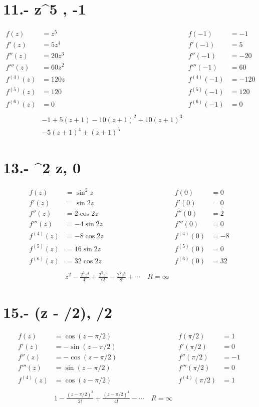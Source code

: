 \documentclass{article}
\begin{document}
\section*{11.- z^5 , -1}
\begin{align*}
f(z) &= z^5 & f(-1) &= -1 \\
f'(z) &= 5z^4 & f'(-1) &= 5 \\
f''(z) &= 20z^3 & f''(-1) &= -20 \\
f'''(z) &= 60z^2 & f'''(-1) &= 60 \\
f^{(4)}(z) &= 120z & f^{(4)}(-1) &= -120 \\
f^{(5)}(z) &= 120 & f^{(5)}(-1) &= 120 \\
f^{(6)}(z) &= 0 & f^{(6)}(-1) &= 0 \\
\\
& -1 + 5(z+1) - 10(z+1)^2 + 10(z+1)^3 \\
& - 5(z+1)^4 + (z+1)^5
\end{align*}
\section*{13.- \sin^2 z, 0  }
\begin{align*}
f(z) &= \sin^2 z & f(0) &= 0 \\
f'(z) &= \sin 2z & f'(0) &= 0 \\
f''(z) &= 2 \cos 2z & f''(0) &= 2 \\
f'''(z) &= -4 \sin 2z & f'''(0) &= 0 \\
f^{(4)}(z) &= -8 \cos 2z & f^{(4)}(0) &= -8 \\
f^{(5)}(z) &= 16 \sin 2z & f^{(5)}(0) &= 0 \\
f^{(6)}(z) &= 32 \cos 2z & f^{(6)}(0) &= 32 \\
\\
& z^2 - \frac{2^3 z^4}{4!} + \frac{2^5 z^6}{6!} - \frac{2^7 z^8}{8!} + \dotsb \quad R = \infty 
\end{align*}
\section*{15.- \cos (z - \pi/2), \pi/2   }
\begin{align*}
f(z) &= \cos (z - \pi/2) & f(\pi/2) &= 1 \\
f'(z) &= -\sin (z - \pi/2) & f'(\pi/2) &= 0 \\
f''(z) &= -\cos (z - \pi/2) & f''(\pi/2) &= -1 \\
f'''(z) &= \sin (z - \pi/2) & f'''(\pi/2) &= 0 \\
f^{(4)}(z) &= \cos (z - \pi/2) & f^{(4)}(\pi/2) &= 1 \\
\\
& 1 - \frac{(z - \pi/2)^2}{2!} + \frac{(z - \pi/2)^4}{4!} - \dotsb \quad R = \infty 
\end{align*}
\end{document}
